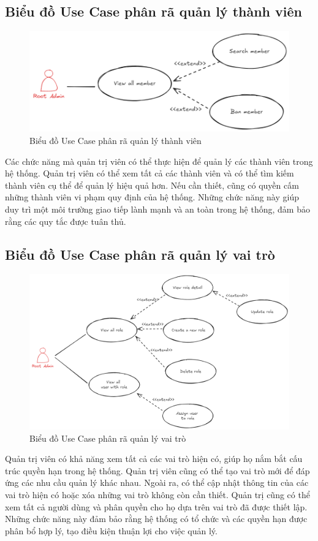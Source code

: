 \documentclass[../index.tex]{subfiles}
\begin{document}
    \subsection{Biểu đồ Use Case phân rã quản lý thành viên}
    \begin{figure}[H]
        \centering
        \includegraphics[width=0.85\linewidth]{
            figures/usecase-member-management.png
        }
        \caption{Biểu đồ Use Case phân rã quản lý thành viên}
    \end{figure}
    Các chức năng mà quản trị viên có thể thực hiện để quản lý các thành viên
    trong hệ thống. Quản trị viên có thể xem tất cả các thành viên và có thể tìm
    kiếm thành viên cụ thể để quản lý hiệu quả hơn. Nếu cần thiết, cũng có quyền
    cấm những thành viên vi phạm quy định của hệ thống. Những chức năng này giúp
    duy trì một môi trường giao tiếp lành mạnh và an toàn trong hệ thống, đảm bảo
    rằng các quy tắc được tuân thủ.

    \subsection{Biểu đồ Use Case phân rã quản lý vai trò}
    \begin{figure}[H]
        \centering
        \includegraphics[width=0.85\linewidth]{
            figures/usecase-role-management.png
        }
        \caption{Biểu đồ Use Case phân rã quản lý vai trò}
    \end{figure}
    Quản trị viên có khả năng xem tất cả các vai trò hiện có, giúp họ nắm bắt
    cấu trúc quyền hạn trong hệ thống. Quản trị viên cũng có thể tạo vai trò mới
    để đáp ứng các nhu cầu quản lý khác nhau. Ngoài ra, có thể cập nhật thông tin
    của các vai trò hiện có hoặc xóa những vai trò không còn cần thiết. Quản trị
    cũng có thể xem tất cả người dùng và phân quyền cho họ dựa trên vai trò đã
    được thiết lập. Những chức năng này đảm bảo rằng hệ thống có tổ chức và các quyền
    hạn được phân bổ hợp lý, tạo điều kiện thuận lợi cho việc quản lý.
\end{document}
